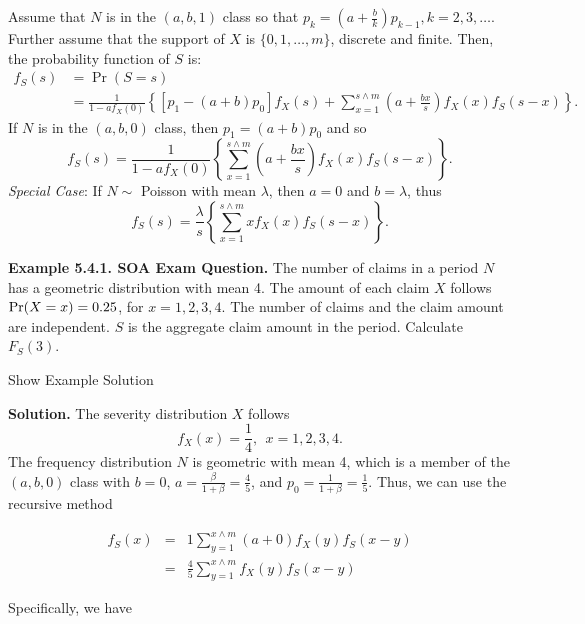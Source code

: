 \documentclass[]{book}
\theoremstyle{definition}
\theoremstyle{definition}
\theoremstyle{definition}
\theoremstyle{remark}
\begin{document}
Assume that \(N\) is in the \((a,b,1)\) class so that
\(p_{k}=\left( a+\frac{b}{k} \right) p_{k-1}, k = 2,3,\ldots\). Further
assume that the support of \(X\) is \(\{0,1,\ldots,m\}\), discrete and
finite. Then, the probability function of \(S\) is: \[\begin{aligned}
f_{S}(s)&=\Pr (S=s) \\
&=\frac{1}{1-af_{X}(0)}\left\{ \left[ p_1 -(a+b)p_{0}\right]
f_X (s)+\sum_{x=1}^{s\wedge m}\left( a+\frac{bx}{s} \right) f_X (x)f_{S}(s-x)\right\}.
\end{aligned}\] If \(N\) is in the \((a,b,0)\) class, then
\(p_1=(a+b)p_0\) and so \[
f_S(s)=\frac{1}{1-af_X (0)}\left\{ \sum_{x=1}^{s\wedge m}\left( a+\frac{bx
}{s}\right) f_X (x)f_{S}(s-x)\right\}.
\] \emph{Special Case}: If \(N \sim\) Poisson with mean \(\lambda\),
then \(a=0\) and \(b=\lambda\), thus \[
f_{S}(s)=\frac{\lambda }{s}\left\{ \sum_{x=1}^{s \wedge
m} x f_X (x) f_S (s-x)\right\} .
\]

\textbf{Example 5.4.1. SOA Exam Question.} The number of claims in a
period \(N\) has a geometric distribution with mean 4. The amount of
each claim \(X\) follows \({\rm Pr} (X = x) = 0.25\), for
\(x = 1,2,3,4\). The number of claims and the claim amount are
independent. \(S\) is the aggregate claim amount in the period.
Calculate \(F_S(3)\).

Show Example Solution

\hypertarget{toggleExampleAggLoss.4.1}{}
\textbf{Solution.} The severity distribution \(X\) follows
\[f_X (x) = \frac{1}{4}, \ \ x=1, 2, 3, 4.\] The frequency distribution
\(N\) is geometric with mean 4, which is a member of the \((a,b,0)\)
class with \(b=0\), \(a=\frac{\beta}{1+\beta} = \frac{4}{5}\), and
\(p_0 = \frac{1}{1+\beta} = \frac{1}{5}\). Thus, we can use the
recursive method

\begin{eqnarray*}
f_S (x) &=& 1 \sum_{y=1}^{x\wedge m} (a+0) f_X (y) f_S (x-y) \\
&=& \frac{4}{5} \sum_{y=1}^{x\wedge m} f_X (y) f_S (x-y)
\end{eqnarray*}

Specifically, we have
\end{document}
